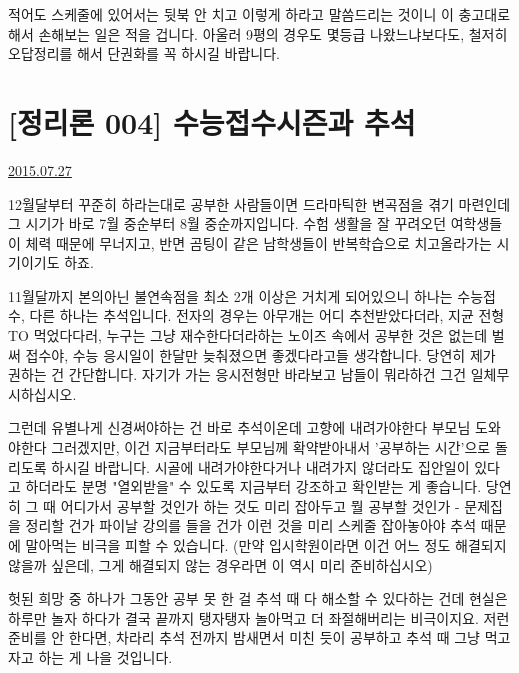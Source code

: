 적어도 스케줄에 있어서는 뒷북 안 치고 이렇게 하라고 말씀드리는 것이니 이 충고대로 해서 손해보는 일은 적을 겁니다.
아울러 9평의 경우도 몇등급 나왔느냐보다도, 철저히 오답정리를 해서 단권화를 꼭 하시길 바랍니다.
\vspace{5mm}






\section{[정리론 004] 수능접수시즌과 추석}
\href{https://www.kockoc.com/Apoc/218893}{2015.07.27}

\vspace{5mm}

12월달부터 꾸준히 하라는대로 공부한 사람들이면
드라마틱한 변곡점을 겪기 마련인데 그 시기가 바로 7월 중순부터 8월 중순까지입니다.
수험 생활을 잘 꾸려오던 여학생들이 체력 때문에 무너지고, 반면 곰팅이 같은 남학생들이 반복학습으로 치고올라가는 시기이기도 하죠.
\vspace{5mm}

11월달까지 본의아닌 불연속점을 최소 2개 이상은 거치게 되어있으니
하나는 수능접수, 다른 하나는 추석입니다.
전자의 경우는 아무개는 어디 추천받았다더라, 지균 전형 TO 먹었다다러, 누구는 그냥 재수한다더라하는 노이즈 속에서
공부한 것은 없는데 벌써 접수야, 수능 응시일이 한달만 늦춰졌으면 좋겠다라고들 생각합니다.
당연히 제가 권하는 건 간단합니다. 자기가 가는 응시전형만 바라보고 남들이 뭐라하건 그건 일체무시하십시오.
\vspace{5mm}

그런데 유별나게 신경써야하는 건 바로 추석이온데
고향에 내려가야한다 부모님 도와야한다 그러겠지만, 이건 지금부터라도 부모님께 확약받아내서 '공부하는 시간'으로 돌리도록 하시길 바랍니다.
시골에 내려가야한다거나 내려가지 않더라도 집안일이 있다고 하더라도 분명 "열외받을" 수 있도록 지금부터 강조하고 확인받는 게 좋습니다.
당연히 그 때 어디가서 공부할 것인가 하는 것도 미리 잡아두고 뭘 공부할 것인가 - 문제집을 정리할 건가 파이날 강의를 들을 건가
이런 것을 미리 스케줄 잡아놓아야 추석 때문에 말아먹는 비극을 피할 수 있습니다.
(만약 입시학원이라면 이건 어느 정도 해결되지 않을까 싶은데, 그게 해결되지 않는 경우라면 이 역시 미리 준비하십시오)
\vspace{5mm}

헛된 희망 중 하나가 그동안 공부 못 한 걸 추석 때 다 해소할 수 있다하는 건데
현실은 하루만 놀자 하다가 결국 끝까지 탱자탱자 놀아먹고 더 좌절해버리는 비극이지요.
저런 준비를 안 한다면, 차라리 추석 전까지 밤새면서 미친 듯이 공부하고 추석 때 그냥 먹고 자고 하는 게 나을 것입니다.
\vspace{5mm}


